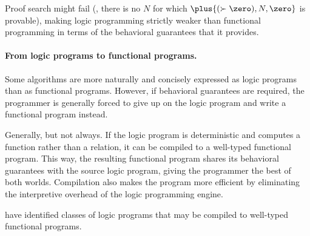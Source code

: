 Proof search might fail (\eg, there is no $N$ for which $\plus{(\succ{\zero}),N,\zero}$ is provable), making logic programming strictly weaker than functional programming in terms of the behavioral guarantees that it provides.





\paragraph{From logic programs to functional programs.}
Some algorithms are more naturally and concisely expressed as logic programs than as functional programs.%
However, if behavioral guarantees are required, the programmer is generally forced to give up on the logic program and write a functional program instead.

Generally, but not always.
If the logic program is deterministic and computes a function rather than a relation, it can be compiled to a well-typed functional program.
This way, the resulting functional program shares its behavioral guarantees with the source logic program, giving the programmer the best of both worlds.
Compilation also makes the program more efficient by eliminating the interpretive overhead of the logic programming engine.

\textcite{Debray+Warren:TOPLAS89}
\textcites{Felleisen:IU86}{Haynes:JLP86} have identified classes of logic programs that may be compiled to well-typed functional programs.

